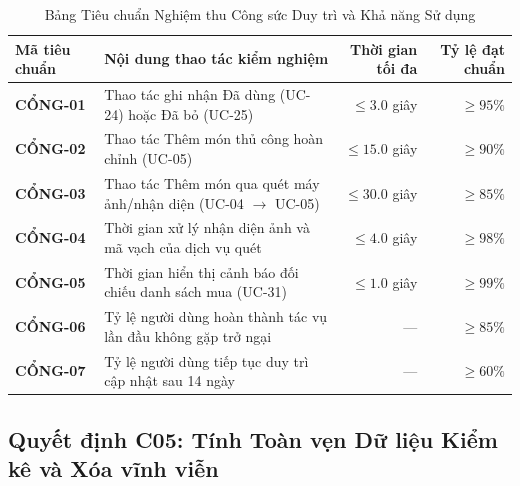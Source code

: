\documentclass[10pt,a4paper]{article}
\begin{document}
\begin{table}[h]
\centering
\begin{tabularx}{\textwidth}{|l|X|r|r|}
\hline
\textbf{Mã tiêu chuẩn} & \textbf{Nội dung thao tác kiểm nghiệm} & \textbf{Thời gian tối đa} & \textbf{Tỷ lệ đạt chuẩn} \\
\hline
\textbf{CỔNG-01} & Thao tác ghi nhận Đã dùng (UC-24) hoặc Đã bỏ (UC-25) & $\le 3.0$ giây & $\ge 95\%$ \\
\textbf{CỔNG-02} & Thao tác Thêm món thủ công hoàn chỉnh (UC-05) & $\le 15.0$ giây & $\ge 90\%$ \\
\textbf{CỔNG-03} & Thao tác Thêm món qua quét máy ảnh/nhận diện (UC-04 $\to$ UC-05) & $\le 30.0$ giây & $\ge 85\%$ \\
\textbf{CỔNG-04} & Thời gian xử lý nhận diện ảnh và mã vạch của dịch vụ quét & $\le 4.0$ giây & $\ge 98\%$ \\
\textbf{CỔNG-05} & Thời gian hiển thị cảnh báo đối chiếu danh sách mua (UC-31) & $\le 1.0$ giây & $\ge 99\%$ \\
\textbf{CỔNG-06} & Tỷ lệ người dùng hoàn thành tác vụ lần đầu không gặp trở ngại & --- & $\ge 85\%$ \\
\textbf{CỔNG-07} & Tỷ lệ người dùng tiếp tục duy trì cập nhật sau 14 ngày & --- & $\ge 60\%$ \\
\hline
\end{tabularx}
\caption{Bảng Tiêu chuẩn Nghiệm thu Công sức Duy trì và Khả năng Sử dụng}
\end{table}

\subsection{Quyết định C05: Tính Toàn vẹn Dữ liệu Kiểm kê và Xóa vĩnh viễn}
\end{document}
